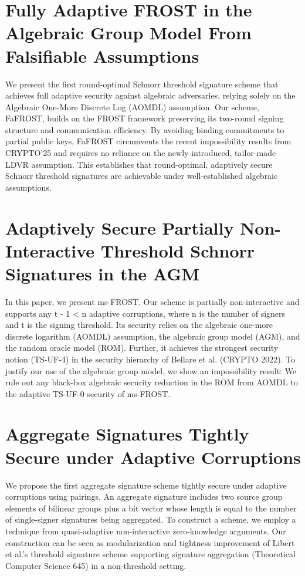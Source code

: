 \documentclass[11pt,oneside]{book}
\theoremstyle{definition}
\theoremstyle{remark}
\theoremstyle{plain}
\begin{document}
 \section{\cite{cryptoeprint:2025/1950} Fully Adaptive FROST in the Algebraic Group Model From Falsifiable Assumptions }
 We present the first round-optimal Schnorr threshold signature scheme that achieves full adaptive security against algebraic adversaries, relying solely on the Algebraic One-More Discrete Log (AOMDL) assumption.
Our scheme, FaFROST, builds on the FROST framework preserving its two-round signing structure and communication efficiency.
By avoiding binding commitments to partial public keys, FaFROST circumvents the recent impossibility results from CRYPTO’25 and requires no reliance on the newly introduced, tailor-made LDVR assumption.
This establishes that round-optimal, adaptively secure Schnorr threshold signatures are achievable under well-established algebraic assumptions.

\section{\cite{cryptoeprint:2025/1953} Adaptively Secure Partially Non-Interactive Threshold Schnorr Signatures in the AGM}
In this paper, we present ms-FROST. Our scheme is partially non-interactive and supports any t - 1 < n adaptive corruptions, where n is the number of signers and t is the signing threshold. Its security relies on the algebraic one-more discrete logarithm (AOMDL) assumption, the algebraic group model (AGM), and the random oracle model (ROM). Further, it achieves the strongest security notion (TS-UF-4) in the security hierarchy of Bellare et al. (CRYPTO 2022). To justify our use of the algebraic group model, we show an impossibility result: We rule out any black-box algebraic security reduction in the ROM from AOMDL to the adaptive TS-UF-0 security of ms-FROST.

\section{\cite{cryptoeprint:2025/1955} Aggregate Signatures Tightly Secure under Adaptive Corruptions}
We propose the first aggregate signature scheme tightly secure under adaptive corruptions using pairings. An aggregate signature includes two source group elements of bilinear groups plus a bit vector whose length is equal to the number of single-signer signatures being aggregated. To construct a scheme, we employ a technique from quasi-adaptive non-interactive zero-knowledge arguments. Our construction can be seen as modularization and tightness improvement of Libert et al.'s threshold signature scheme supporting signature aggregation (Theoretical Computer Science 645) in a non-threshold setting.
\end{document}
